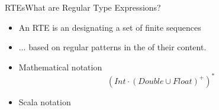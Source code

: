 \newsavebox\exnotebox
\begin{lrbox}{\exnotebox}
  \begin{minipage}{7cm}
    
  \end{minipage}
\end{lrbox}


\begin{frame}{RTEs}{What are Regular Type Expressions?}
  \begin{itemize}
  \item An RTE is an  designating a set  of finite sequences
  \item ... based on regular patterns in the  of their content.
  \item Mathematical notation
    \[(Int \cdot (Double \cup Float)^+)^*\]
  \item Scala notation\\
    \usebox\exnotebox
  \end{itemize}
\end{frame}
